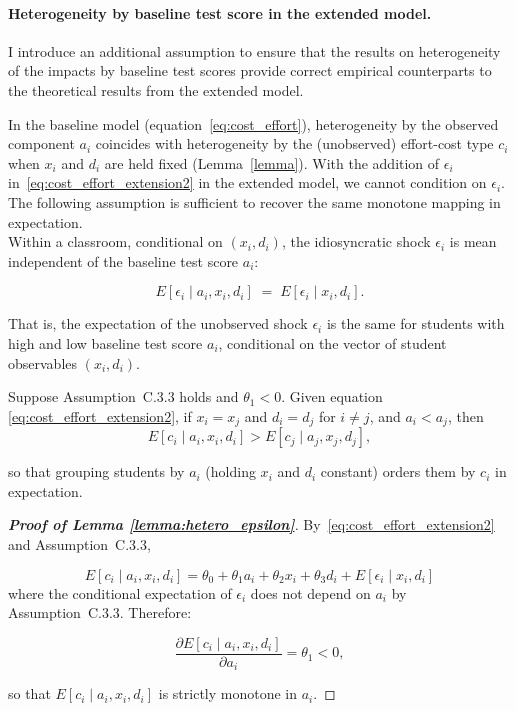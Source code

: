 \paragraph{Heterogeneity by baseline test score in the extended model.}
I introduce an additional assumption to ensure that the results on heterogeneity of the impacts by baseline test scores provide correct empirical counterparts to the theoretical results from the extended model.\par 






In the baseline model (equation~\eqref{eq:cost_effort}), heterogeneity by the observed component $a_i$ coincides with heterogeneity by the (unobserved) effort-cost type $c_i$ when $x_i$ and $d_i$ are held fixed (Lemma~\ref{lemma}). With the addition of $\epsilon_i$ in~\eqref{eq:cost_effort_extension2} in the extended model, we cannot condition on $\epsilon_i$. The following assumption is sufficient to recover the same monotone mapping in expectation.\\

Within a classroom, conditional on $(x_i,d_i)$, the idiosyncratic shock $\epsilon_i$ is mean independent of the baseline test score $a_i$:

\[
E[\epsilon_i \mid a_i,x_i,d_i] \;=\; E[\epsilon_i \mid x_i,d_i].
\]


That is, the expectation of the unobserved shock $\epsilon_i$ is the same for students with high and low baseline test score $a_i$, conditional on the vector of student observables $(x_i,d_i)$.


\begin{lemma}\label{lemma:hetero_epsilon}
Suppose Assumption~C.3.3 holds and $\theta_1< 0$. Given equation \eqref{eq:cost_effort_extension2}, if $x_i=x_j$ and $d_i=d_j$ for $i\neq j$, and $a_i<a_j$, then 
\[
E[c_i\mid a_i,x_i,d_i]>E[c_j\mid a_j,x_j,d_j],
\]


\noindent so that grouping students by $a_i$ (holding $x_i$ and $d_i$ constant) orders them by $c_i$ in expectation.
\end{lemma}

\begin{proof}[{\bf Proof of  Lemma \ref{lemma:hetero_epsilon}}] 
By~\eqref{eq:cost_effort_extension2} and Assumption~C.3.3,

\[
E[c_i\mid a_i, x_i, d_i]=\theta_0 + \theta_1 a_i + \theta_2 x_i + \theta_3 d_i + E[\epsilon_i\mid x_i,d_i]
\]
\noindent where the conditional expectation of $\epsilon_i$ does not depend on $a_i$ by Assumption~C.3.3. Therefore:

\[
\frac{\partial E[c_i\mid a_i ,x_i ,d_i]}{\partial a_i}=\theta_1<0,
\]

\noindent so that $E[c_i\mid a_i, x_i, d_i]$ is strictly monotone in $a_i$.

\end{proof}


